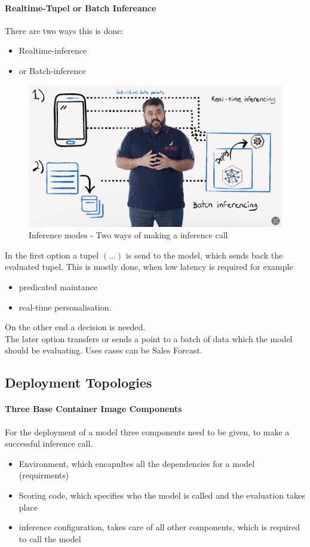 \paragraph{Realtime-Tupel or Batch Infereance}
There are two ways this is done:
\begin{itemize}
	\item Realtime-inference 
	\item or Batch-inference
\end{itemize}

\begin{figure}[H]
	\centering
	\includegraphics[scale = 0.1]{attachment/chapter_10/Scc012}
	\caption{Inference modes - Two ways of making a inference call}
\end{figure}

In the first option a tupel $(...)$ is send to the model, which sends back the evaluated tupel. This is mostly done, when low latency is required for example
\begin{itemize}
	\item predicated maintance
	\item real-time personalisation.
\end{itemize}
On the other end a decision is needed.\\

The later option transfers or sends a point to a batch of data which the model should be evaluating. Uses cases can be Sales Forcast.

\subsection{Deployment Topologies}
\paragraph{Three Base Container Image Components}
For the deployment of a model three components need to be given, to make a successful inference call.
\begin{itemize}
	\item Environment, which encapultes all the dependencies for a model (requirments)
	\item Scoring code, which specifies who the model is called and the evaluation takes place
	\item inference configuration, takes care of all other components, which is required to call the model 
\end{itemize}

